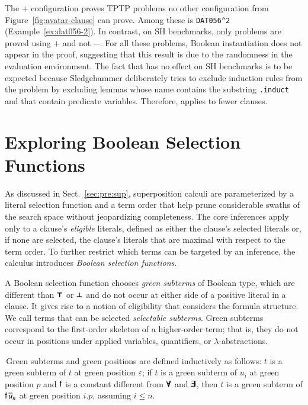The $+$ configuration proves  TPTP problems no other
configuration from Figure~\ref{fig:avatar-clause} can prove. Among these is
\texttt{DAT056\^{}2} (Example~\ref{ex:dat056-2}). In contrast, on SH benchmarks, only
 problems are proved using $+$ and not
$-$. For all these problems, Boolean instantiation does not
appear in the proof, suggesting that this result is due to the randomness in the
evaluation environment. The fact that  has no effect on SH benchmarks
is to be expected because 
Sledgehammer deliberately tries to exclude induction rules from the problem by
excluding lemmas whose name contains the substring \texttt{.induct} and that
contain predicate variables. Therefore,  applies to fewer clauses.

\section{Exploring Boolean Selection Functions}
\label{sec:ho-tech:bool-select}

As discussed in Sect.~\ref{sec:pre:sup}, superposition calculi are parameterized by a literal selection function and a
term order that help prune considerable swaths of the search space without
jeopardizing completeness. The core inferences apply only to a clause's
\emph{eligible} literals, defined as either the clause's selected
literals or, if none are selected, the clause's literals that are maximal with
respect to the term order. To further restrict which terms can be targeted by
an inference, the \osup{} calculus introduces \emph{Boolean selection
functions}. 

A Boolean selection function chooses \emph{green subterms} of Boolean type,
which are different than $\pmb{\top}$ or $\pmb{\bot}$ and do not occur at either side
of a positive literal in a clause. It gives rise to a notion of eligibility that
considers the formula structure. We call terms that can be selected
\emph{selectable subterms}. Green subterms correspond to the first-order
skeleton of a higher-order term; that is, they do not occur in positions under
applied variables, quantifiers, or $\lambda$-abstractions. 



\begin{defi}
  \,Green subterms and green positions are defined inductively as
  follows: $t$ is a green subterm of $t$ at green position $\varepsilon$; if $t$ is a green subterm of $u_i$ at green position $p$
  and $\mathsf{f}$ is a constant different from $\pmb{\forall}$ and $\pmb{\exists}$, then
  $t$ is a green subterm of $\mathsf{f} \, \overline{u}_{n}$ at green position $i.p$,
  assuming $i \leq n$.
\end{defi}

